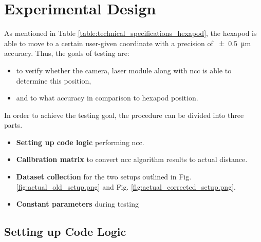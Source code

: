 \chapter{Experimental Design}

As mentioned in Table \ref{table:technical_specifications_hexapod}, the hexapod is able to move to a certain user-given coordinate with a precision of \SI{\pm0.5}{\micro\meter} accuracy. Thus, the goals of testing are:
\begin{itemize}
    \item to verify whether the camera, laser module along with \gls{ncc} is able to determine this position,
    \item and to what accuracy in comparison to hexapod position.     
\end{itemize}

\vspace{5mm}

\noindent In order to achieve the testing goal, the procedure can be divided into three parts.

\begin{itemize}
    \item \textbf{Setting up code logic} performing \gls{ncc}.
    \item \textbf{Calibration matrix} to convert \gls{ncc} algorithm results to actual distance.
    \item \textbf{Dataset collection} for the two setups outlined in Fig. \ref{fig:actual_old_setup.png} and Fig. \ref{fig:actual_corrected_setup.png}.
    \item \textbf{Constant parameters} during testing
\end{itemize}


\section{Setting up Code Logic}\label{section:code_logic}

